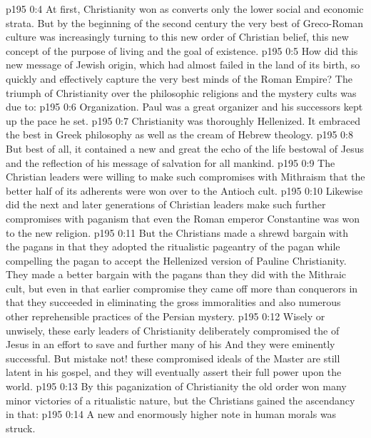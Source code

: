 \pc \vs p195 0:4 At first, Christianity won as converts only the lower social and economic strata. But by the beginning of the second century the very best of Greco\hyp{}Roman culture was increasingly turning to this new order of Christian belief, this new concept of the purpose of living and the goal of existence.
\vs p195 0:5 How did this new message of Jewish origin, which had almost failed in the land of its birth, so quickly and effectively capture the very best minds of the Roman Empire? The triumph of Christianity over the philosophic religions and the mystery cults was due to:
\pc \vs p195 0:6 \bibnobreakspace Organization. Paul was a great organizer and his successors kept up the pace he set.
\pc \vs p195 0:7 \bibnobreakspace Christianity was thoroughly Hellenized. It embraced the best in Greek philosophy as well as the cream of Hebrew theology.
\pc \vs p195 0:8 \bibnobreakspace But best of all, it contained a new and great  the echo of the life bestowal of Jesus and the reflection of his message of salvation for all mankind.
\pc \vs p195 0:9 \bibnobreakspace The Christian leaders were willing to make such compromises with Mithraism that the better half of its adherents were won over to the Antioch cult.
\pc \vs p195 0:10 \bibnobreakspace Likewise did the next and later generations of Christian leaders make such further compromises with paganism that even the Roman emperor Constantine was won to the new religion.
\pc \vs p195 0:11 But the Christians made a shrewd bargain with the pagans in that they adopted the ritualistic pageantry of the pagan while compelling the pagan to accept the Hellenized version of Pauline Christianity. They made a better bargain with the pagans than they did with the Mithraic cult, but even in that earlier compromise they came off more than conquerors in that they succeeded in eliminating the gross immoralities and also numerous other reprehensible practices of the Persian mystery.
\vs p195 0:12 Wisely or unwisely, these early leaders of Christianity deliberately compromised the  of Jesus in an effort to save and further many of his  And they were eminently successful. But mistake not! these compromised ideals of the Master are still latent in his gospel, and they will eventually assert their full power upon the world.
\vs p195 0:13 By this paganization of Christianity the old order won many minor victories of a ritualistic nature, but the Christians gained the ascendancy in that:
\pc \vs p195 0:14 \bibnobreakspace A new and enormously higher note in human morals was struck.
